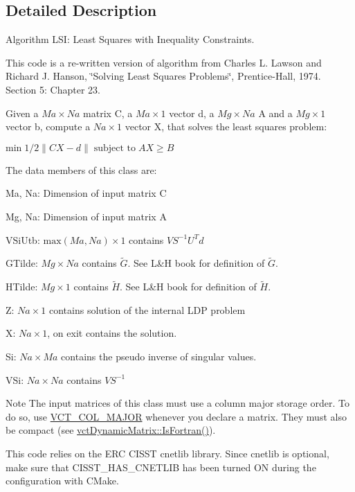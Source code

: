 \subsection{Detailed Description}
Algorithm L\+S\+I\+: Least Squares with Inequality Constraints.

This code is a re-\/written version of algorithm from Charles L. Lawson and Richard J. Hanson, \char`\"{}\+Solving Least Squares Problems\char`\"{}, Prentice-\/\+Hall, 1974. Section 5\+: Chapter 23.

Given a $Ma \times Na$ matrix C, a $Ma \times 1$ vector d, a $Mg \times Na$ A and a $Mg \times 1$ vector b, compute a $Na \times 1$ vector X, that solves the least squares problem\+:

$ \mbox{min} \; 1 / 2 \| CX - d \| \; \mbox{subject to} \; AX \geq B$

The data members of this class are\+:
\begin{DoxyItemize}
\item Ma, Na\+: Dimension of input matrix C
\item Mg, Na\+: Dimension of input matrix A
\item V\+Si\+Utb\+: $ \mbox{max}(Ma, Na) \times 1 $ contains $ VS^{-1}U^{T}d $
\item G\+Tilde\+: $ Mg \times Na $ contains $ \tilde{G} $. See L\&H book for definition of $ \tilde{G} $.
\item H\+Tilde\+: $ Mg \times 1 $ contains $ \tilde{H} $. See L\&H book for definition of $ \tilde{H} $.
\item Z\+: $ Na \times 1 $ contains solution of the internal L\+D\+P problem
\item X\+: $ Na \times 1 $, on exit contains the solution.
\item Si\+: $ Na \times Ma $ contains the pseudo inverse of singular values.
\item V\+Si\+: $ Na \times Na $ contains $ VS^{-1} $
\end{DoxyItemize}

\begin{DoxyNote}{Note}
The input matrices of this class must use a column major storage order. To do so, use \hyperlink{vct_forward_declarations_8h_a432cdf8923afaf82f551450ad4034746}{V\+C\+T\+\_\+\+C\+O\+L\+\_\+\+M\+A\+J\+O\+R} whenever you declare a matrix. They must also be compact (see \hyperlink{classvct_dynamic_const_matrix_base_aac5f19015b4888f760f99daa4bac199c}{vct\+Dynamic\+Matrix\+::\+Is\+Fortran()}).

This code relies on the E\+R\+C C\+I\+S\+S\+T cnetlib library. Since cnetlib is optional, make sure that C\+I\+S\+S\+T\+\_\+\+H\+A\+S\+\_\+\+C\+N\+E\+T\+L\+I\+B has been turned O\+N during the configuration with C\+Make. 
\end{DoxyNote}


